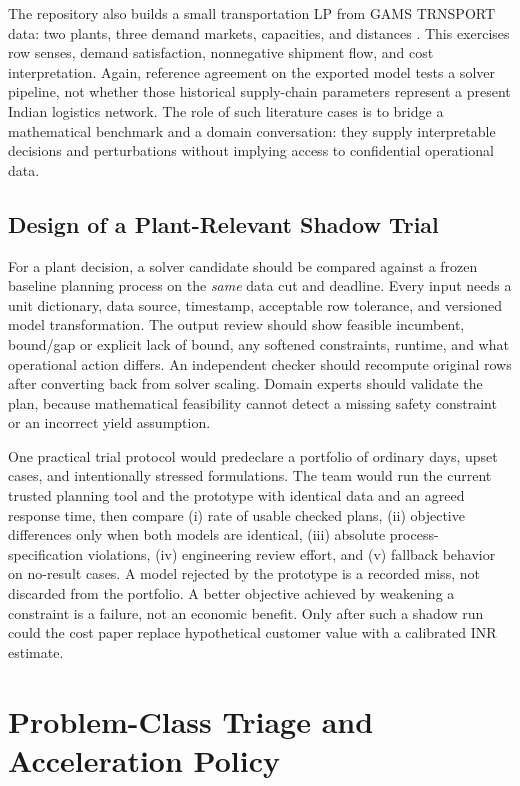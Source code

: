 \documentclass[10pt,a4paper,twocolumn]{article}
\begin{document}
The repository also builds a small transportation LP from GAMS TRNSPORT data: two plants, three demand markets, capacities, and distances \cite{gamstrnsport,industrial}. This exercises row senses, demand satisfaction, nonnegative shipment flow, and cost interpretation. Again, reference agreement on the exported model tests a solver pipeline, not whether those historical supply-chain parameters represent a present Indian logistics network. The role of such literature cases is to bridge a mathematical benchmark and a domain conversation: they supply interpretable decisions and perturbations without implying access to confidential operational data.

\subsection{Design of a Plant-Relevant Shadow Trial}

For a plant decision, a solver candidate should be compared against a frozen baseline planning process on the \emph{same} data cut and deadline. Every input needs a unit dictionary, data source, timestamp, acceptable row tolerance, and versioned model transformation. The output review should show feasible incumbent, bound/gap or explicit lack of bound, any softened constraints, runtime, and what operational action differs. An independent checker should recompute original rows after converting back from solver scaling. Domain experts should validate the plan, because mathematical feasibility cannot detect a missing safety constraint or an incorrect yield assumption.

One practical trial protocol would predeclare a portfolio of ordinary days, upset cases, and intentionally stressed formulations. The team would run the current trusted planning tool and the prototype with identical data and an agreed response time, then compare (i) rate of usable checked plans, (ii) objective differences only when both models are identical, (iii) absolute process-specification violations, (iv) engineering review effort, and (v) fallback behavior on no-result cases. A model rejected by the prototype is a recorded miss, not discarded from the portfolio. A better objective achieved by weakening a constraint is a failure, not an economic benefit. Only after such a shadow run could the cost paper replace hypothetical customer value with a calibrated INR estimate.

\section{Problem-Class Triage and Acceleration Policy}
\end{document}
